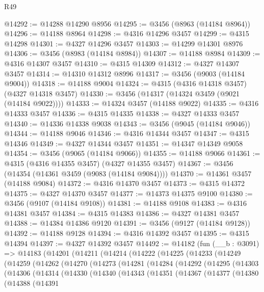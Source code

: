 \begin{lexlean}{R49}
\begin{coremodule}
@14292 := @14288 @14290 @8956
@14295 := @3456 (@8963 (@14184 @8964))
@14296 := @14188 @8964
@14298 := @4316 @14296 @3457
@14299 := @4315 @14298
@14301 := @4327 @14296 @3457
@14303 := @14299 @14301 @8976
@14306 := @3456 (@8983 (@14184 @8984))
@14307 := @14188 @8984
@14309 := @4316 @14307 @3457
@14310 := @4315 @14309
@14312 := @4327 @14307 @3457
@14314 := @14310 @14312 @8996
@14317 := @3456 (@9003 (@14184 @9004))
@14318 := @14188 @9004
@14324 := @4315 (@4316 @14318 @3457) (@4327 @14318 @3457)
@14330 := @3456 (@14317 (@14324 @3459 (@9021 (@14184 @9022))))
@14333 := @14324 @3457 (@14188 @9022)
@14335 := @4316 @14333 @3457
@14336 := @4315 @14335
@14338 := @4327 @14333 @3457
@14340 := @14336 @14338 @9038
@14343 := @3456 (@9045 (@14184 @9046))
@14344 := @14188 @9046
@14346 := @4316 @14344 @3457
@14347 := @4315 @14346
@14349 := @4327 @14344 @3457
@14351 := @14347 @14349 @9058
@14354 := @3456 (@9065 (@14184 @9066))
@14355 := @14188 @9066
@14361 := @4315 (@4316 @14355 @3457) (@4327 @14355 @3457)
@14367 := @3456 (@14354 (@14361 @3459 (@9083 (@14184 @9084))))
@14370 := @14361 @3457 (@14188 @9084)
@14372 := @4316 @14370 @3457
@14373 := @4315 @14372
@14375 := @4327 @14370 @3457
@14377 := @14373 @14375 @9100
@14380 := @3456 (@9107 (@14184 @9108))
@14381 := @14188 @9108
@14383 := @4316 @14381 @3457
@14384 := @4315 @14383
@14386 := @4327 @14381 @3457
@14388 := @14384 @14386 @9120
@14391 := @3456 (@9127 (@14184 @9128))
@14392 := @14188 @9128
@14394 := @4316 @14392 @3457
@14395 := @4315 @14394
@14397 := @4327 @14392 @3457
@14492 := @14182
    (fun (__b : @3091) =>
    @14183
      (@14201
        (@14211
          (@14214
            (@14222
              (@14225
                (@14233
                  (@14249
                    (@14259
                      (@14262
                        (@14270
                          (@14273
                            (@14281
                              (@14284
                                (@14292
                                  (@14295
                                    (@14303
                                      (@14306
                                        (@14314
                                          (@14330
                                            (@14340
                                              (@14343
                                                (@14351
                                                  (@14367
                                                    (@14377
                                                      (@14380
                                                        (@14388
                                                          (@14391

\end{coremodule}
\end{lexlean}
